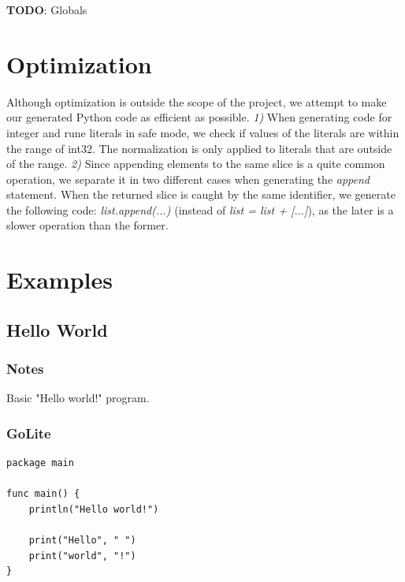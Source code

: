 \documentclass{article}
\begin{document}
\textbf{TODO}: Globals

\section{Optimization}

Although optimization is outside the scope of the project, we attempt to
make our generated Python code as efficient as possible. \textit{1)} When
generating code for integer and rune literals in safe mode, we check if
values of the literals are within the range of int32. The normalization 
is only applied to literals that are outside of the range. \textit{2)}
Since appending elements to the same slice is a quite common operation,
we separate it in two different cases when generating the \textit{append}
statement. When the returned slice is caught by the same identifier, we
generate the following code: \textit{list.append(...)} (instead of
\textit{list = list + [...]}), as the later is a slower operation than 
the former.

\section{Examples}

\subsection{Hello World}
\subsubsection{Notes}
Basic "Hello world!" program.

\subsubsection{GoLite}
\begin{lstlisting}
package main

func main() {
    println("Hello world!")

    print("Hello", " ")
    print("world", "!")
}
\end{lstlisting}
\end{document}
